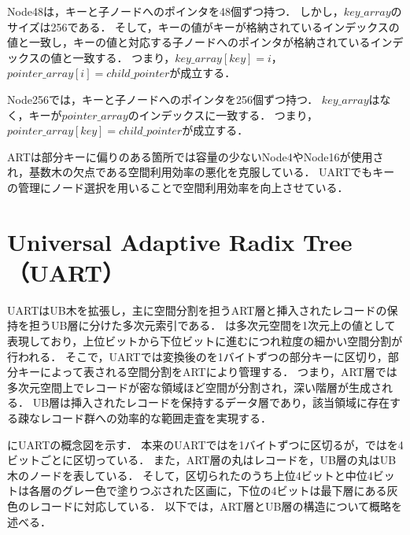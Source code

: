 Node48は，キーと子ノードへのポインタを48個ずつ持つ．
しかし，$key\_array$のサイズは256である．
そして，キーの値がキーが格納されているインデックスの値と一致し，キーの値と対応する子ノードへのポインタが格納されているインデックスの値と一致する．
つまり，$key\_array[key]=i$，$pointer\_array[i]=child\_pointer$が成立する．

Node256では，キーと子ノードへのポインタを256個ずつ持つ．
$key\_array$はなく，キーが$pointer\_array$のインデックスに一致する．
つまり，$pointer\_array[key]=child\_pointer$が成立する．

ARTは部分キーに偏りのある箇所では容量の少ないNode4やNode16が使用され，基数木の欠点である空間利用効率の悪化を克服している．
UARTでもキーの管理にノード選択を用いることで空間利用効率を向上させている．




\chapter{Universal Adaptive Radix Tree（UART）}

UARTはUB木を拡張し，主に空間分割を担うART層と挿入されたレコードの保持を担うUB層に分けた多次元索引である．
\ZCurve は多次元空間を1次元上の値として表現しており，上位ビットから下位ビットに進むにつれ粒度の細かい空間分割が行われる．
そこで，UARTでは変換後の\ZValue を1バイトずつの部分キーに区切り，部分キーによって表される空間分割をARTにより管理する．
つまり，ART層では多次元空間上でレコードが密な領域ほど空間が分割され，深い階層が生成される．
UB層は挿入されたレコードを保持するデータ層であり，該当領域に存在する疎なレコード群への効率的な範囲走査を実現する．

\Fig{\ref{fig:uart}}にUARTの概念図を示す．
本来のUARTでは\ZValue を1バイトずつに区切るが，\Fig{\ref{fig:uart}}では\ZValue を4ビットごとに区切っている．
また，ART層の丸はレコードを，UB層の丸はUB木のノードを表している．
そして，区切られた\ZValue のうち上位4ビットと中位4ビットは各層のグレー色で塗りつぶされた区画に，下位の4ビットは最下層にある灰色のレコードに対応している．
以下では，ART層とUB層の構造について概略を述べる．


